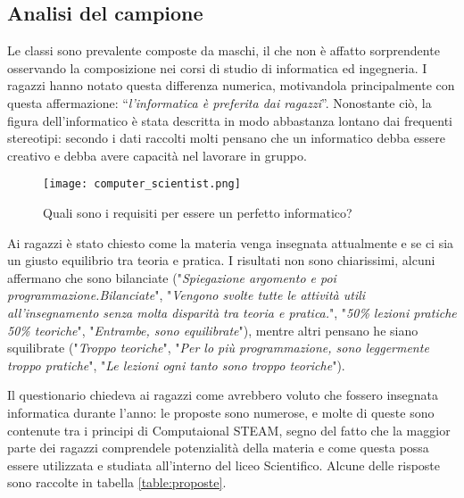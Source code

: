 \subsection{Analisi del campione}
Le classi sono prevalente composte da maschi, il che non è affatto sorprendente osservando la composizione nei corsi di studio di informatica ed ingegneria. I ragazzi hanno notato questa differenza numerica, motivandola principalmente con questa affermazione: “\textit{l'informatica è preferita dai ragazzi}”. Nonostante ciò, la figura dell’informatico è stata descritta in modo abbastanza lontano dai frequenti stereotipi: secondo i dati raccolti molti pensano che un informatico debba essere creativo e debba avere capacità nel lavorare in gruppo.

\begin{figure}[!ht]
    \centering
    \texttt{[image: computer\_scientist.png]}
    \caption{Quali sono i requisiti per essere un perfetto informatico?}
    \label{fig:computer_scientist}
\end{figure}

Ai ragazzi è stato chiesto come la materia venga insegnata attualmente e se ci sia un giusto equilibrio tra teoria e pratica. I risultati non sono chiarissimi, alcuni affermano che sono bilanciate ("\textit{Spiegazione argomento e poi programmazione.Bilanciate}", "\textit{Vengono svolte tutte le attività utili all'insegnamento senza molta disparità tra teoria e pratica.}", "\textit{50\% lezioni pratiche 50\% teoriche}", "\textit{Entrambe, sono equilibrate}"), mentre altri pensano he siano squilibrate ("\textit{Troppo teoriche}", "\textit{Per lo più programmazione, sono leggermente troppo pratiche}", "\textit{Le lezioni ogni tanto sono troppo teoriche}").

Il questionario chiedeva ai ragazzi come avrebbero voluto che fossero insegnata informatica durante l'anno:  le proposte sono numerose, e molte di queste sono contenute tra i principi di Computaional STEAM, segno del fatto che la maggior parte dei ragazzi comprendele potenzialità della materia e come questa possa essere utilizzata e studiata all'interno del liceo Scientifico. Alcune delle risposte sono raccolte in tabella \ref{table:proposte}.

